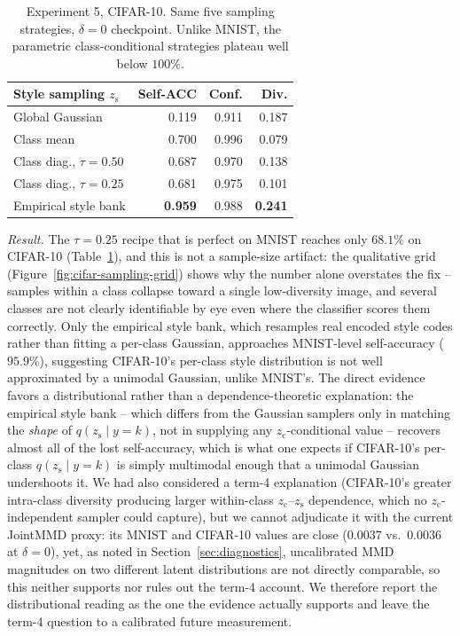 \documentclass[10pt,letterpaper]{article}
\newcommand{\zc}{z_{\mathrm{c}}}
\newcommand{\zs}{z_{\mathrm{s}}}
\begin{document}
\begin{table}[t]
\centering
\small
\caption{Experiment 5, CIFAR-10. Same five sampling strategies, $\delta{=}0$
         checkpoint. Unlike MNIST, the parametric class-conditional
         strategies plateau well below $100\%$.}
\label{tab:cifar-sampling}
\begin{tabular}{lrrr}
\toprule
Style sampling $\zs$ & Self-ACC & Conf. & Div. \\
\midrule
Global Gaussian            & 0.119 & 0.911 & 0.187 \\
Class mean                 & 0.700 & 0.996 & 0.079 \\
Class diag., $\tau{=}0.50$ & 0.687 & 0.970 & 0.138 \\
Class diag., $\tau{=}0.25$ & 0.681 & 0.975 & 0.101 \\
Empirical style bank       & \textbf{0.959} & 0.988 & \textbf{0.241} \\
\bottomrule
\end{tabular}
\end{table}

\emph{Result.} The $\tau{=}0.25$ recipe that is perfect on MNIST reaches
only $68.1\%$ on CIFAR-10 (Table~\ref{tab:cifar-sampling}), and this is not
a sample-size artifact: the qualitative grid
(Figure~\ref{fig:cifar-sampling-grid}) shows why the number alone overstates
the fix -- samples within a class collapse toward a single low-diversity
image, and several classes are not clearly identifiable by eye even where
the classifier scores them correctly. Only the empirical style bank, which
resamples real encoded style codes rather than fitting a per-class
Gaussian, approaches MNIST-level self-accuracy ($95.9\%$), suggesting
CIFAR-10's per-class style distribution is not well approximated by a
unimodal Gaussian, unlike MNIST's. The direct evidence favors a
distributional rather than a dependence-theoretic explanation: the
empirical style bank -- which differs from the Gaussian samplers only in
matching the \emph{shape} of $q(\zs\mid y{=}k)$, not in supplying any
$\zc$-conditional value -- recovers almost all of the lost self-accuracy,
which is what one expects if CIFAR-10's per-class $q(\zs\mid y{=}k)$ is
simply multimodal enough that a unimodal Gaussian undershoots it. We had
also considered a term-4 explanation (CIFAR-10's greater intra-class
diversity producing larger within-class $\zc$--$\zs$ dependence, which no
$\zc$-independent sampler could capture), but we cannot adjudicate it with
the current JointMMD proxy: its MNIST and CIFAR-10 values are close
($0.0037$ vs.\ $0.0036$ at $\delta{=}0$), yet, as noted in
Section~\ref{sec:diagnostics}, uncalibrated MMD magnitudes on two different
latent distributions are not directly comparable, so this neither supports
nor rules out the term-4 account. We therefore report the distributional
reading as the one the evidence actually supports and leave the term-4
question to a calibrated future measurement.
\end{document}

